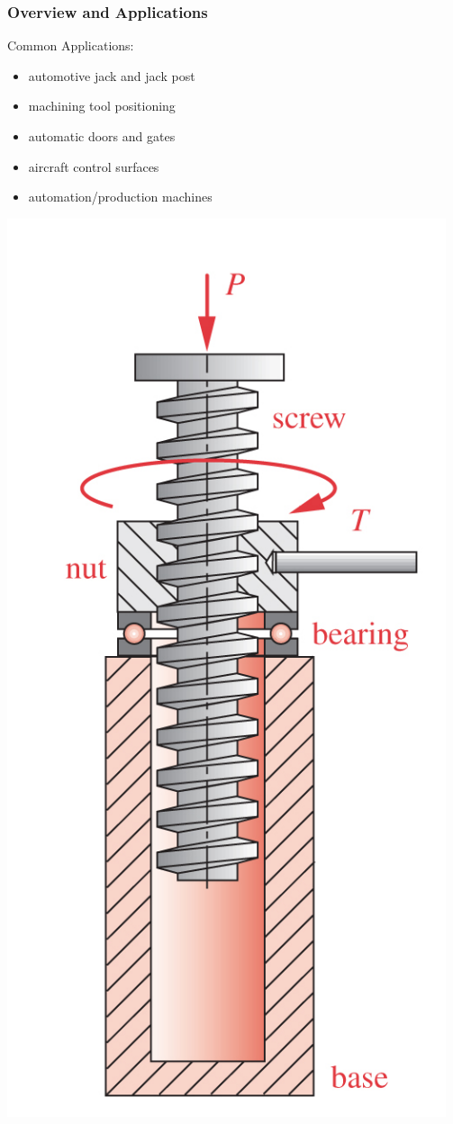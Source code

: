 \documentclass[fleqn]{beamer} %
\newcommand{\sectiontitleI}{Overview and Applications}
\begin{document}
	\begin{frame}[label=sectionI] \small
		\frametitle{\sectiontitleI}	
		
		\begin{multicols}{2}
		Common Applications:
		\begin{itemize}
			\item automotive jack and jack post
			\item machining tool positioning
			\item automatic doors and gates 
			\item aircraft control surfaces
			\item automation/production machines	
		\end{itemize}

		\includegraphics[scale=0.1]{images/figure_15_4.png}
		


\end{multicols}
\end{frame}
\end{document}
